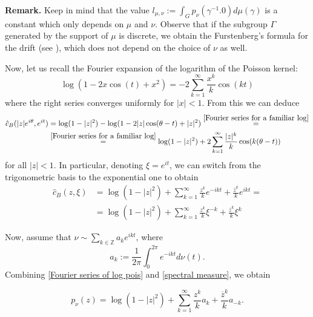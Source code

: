 \documentclass[11pt]{article}
\begin{document}
\textbf{Remark.} Keep in mind that the value $l_{\mu, \nu} := \int_{G}p_\nu(\gamma^{-1}.0)  d \mu(\gamma)$ is a constant which only depends on $\mu$ and $\nu$. Observe that if the subgroup $\Gamma$ generated by the support of $\mu$ is discrete, we obtain the Furstenberg's formula for the drift (see \cite{furstenberg1963noncommuting}), which does not depend on the choice of $\nu$ as well.

Now, let us recall the Fourier expansion of the logarithm of the Poisson kernel:
\begin{equation}
	\label{Fourier series for a familiar log}
	\log(1 - 2x \cos(t) + x^2) = -2 \sum_{k=1}^{\infty} \frac{x^k}{k} \cos(k t)
\end{equation}
where the right series converges uniformly for $|x| < 1$. From this we can deduce
\[
\begin{aligned}
	\hat{c}_B(|z|e^{i \theta}, e^{i t}) &= \log(1 - |z|^2) - \log(1 - 2|z| \cos(\theta - t) + |z|^2) \stackrel{\eqref{Fourier series for a familiar log}}{=} \\ 
								&\stackrel{\eqref{Fourier series for a familiar log}}{=} \log(1 - |z|^2) + 2 \sum_{k=1}^\infty \frac{|z|^k}{k} \cos(k(\theta - t))
\end{aligned}
\]
for all $|z| < 1$. In particular, denoting $\xi = e^{it}$, we can switch from the trigonometric basis to the exponential one to obtain
\begin{equation}
	\label{Fourier series of log pois}
	\begin{aligned}
		\hat{c}_B(z, \xi) &= \log(1 - |z|^2) + \sum_{k=1}^\infty \frac{z^k}{k} e^{-i k t} + \frac{\overline{z}^k}{k} e^{i k t} = \\ 
		&= \log(1 - |z|^2) + \sum_{k=1}^\infty \frac{z^k}{k} \xi^{-k} + \frac{\overline{z}^k}{k} \xi^k
	\end{aligned}
\end{equation}

Now, assume that $\nu \sim \sum_{k \in \mathbb{Z}} a_k e^{i k t}$, where
\begin{equation}
	\label{spectral measure}
	a_k := \frac{1}{2\pi} \int_0^{2 \pi} e^{- i k t} d\nu(t).
\end{equation} 
Combining \eqref{Fourier series of log pois} and \eqref{spectral measure}, we obtain

\begin{equation}
	\label{eq2}
	p_\nu(z) = \log(1 - |z|^2) + \sum_{k=1}^\infty \frac{z^k}{k} a_k + \frac{\overline{z}^k}{k} a_{-k}.
\end{equation}
\end{document}
